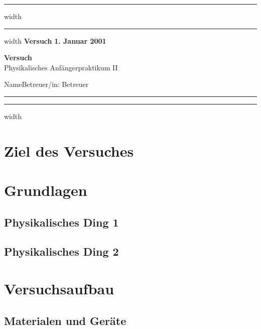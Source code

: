 \documentclass[a4paper,12pt]{article}
\newcounter{Versuch}
\newcommand{\Datum}{\textbf{1. Januar 2001}}        %
\newcommand{\Name}{Name}                            %
\newcommand{\Versuch}{Versuch}                      %
\newcommand{\Betreuer}{Betreuer}                    %
\begin{document}
    \setcounter{Versuch}{1}             %

    
\hrule width\hsize
\vskip 0.1cm    
\hrule width\hsize
\vskip 0.3cm
\noindent
\textbf{Versuch } \hfill  \Datum
\begin{center}
{\textbf{\Versuch}} \\[1ex]
{\small{Physikalisches Anfängerpraktikum II}}
\end{center}
\Name \hfill Betreuer/in: \Betreuer
\vspace{2mm}\hrule
\vskip 0.1cm
\hrule width\hsize
\vspace{3mm}
\vspace{3mm}

\setcounter{tocdepth}{2}
\tableofcontents
\thispagestyle{empty}
\newpage






\section{Ziel des Versuches}
    

    
\section{Grundlagen}

    \subsection{Physikalisches Ding 1}

    \subsection{Physikalisches Ding 2}

\section{Versuchsaufbau}    

    \subsection{Materialen und Geräte}
\end{document}
